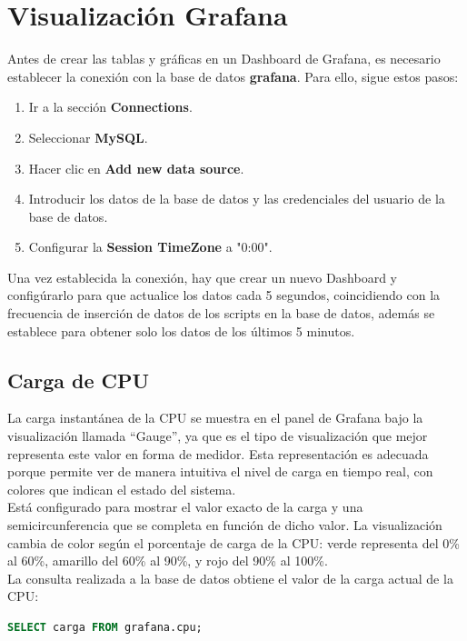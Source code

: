 \documentclass{article}
\begin{document}
\section{Visualización Grafana} \cite{grafana_mysql_docs} \cite{newsmatic_big_data}
Antes de crear las tablas y gráficas en un Dashboard de Grafana, es necesario establecer la conexión con la base de datos \textbf{grafana}. Para ello, sigue estos pasos:

\begin{enumerate}
    \item Ir a la sección \textbf{Connections}.
    \item Seleccionar \textbf{MySQL}.
    \item Hacer clic en \textbf{Add new data source}.
    \item Introducir los datos de la base de datos y las credenciales del usuario de la base de datos.
    \item Configurar la \textbf{Session TimeZone} a "0:00".
\end{enumerate}

Una vez establecida la conexión, hay que crear un nuevo Dashboard y configúrarlo para que actualice los datos cada 5 segundos, coincidiendo con la frecuencia de inserción de datos de los scripts en la base de datos, además se establece para obtener solo los datos de los últimos 5 minutos.

\subsection{Carga de CPU}

La carga instantánea de la CPU se muestra en el panel de Grafana bajo la visualización llamada ``Gauge'', ya que es el tipo de visualización que mejor representa este valor en forma de medidor. Esta representación es adecuada porque permite ver de manera intuitiva el nivel de carga en tiempo real, con colores que indican el estado del sistema.\\

Está configurado para mostrar el valor exacto de la carga y una semicircunferencia que se completa en función de dicho valor. La visualización cambia de color según el porcentaje de carga de la CPU: verde representa del 0\% al 60\%, amarillo del 60\% al 90\%, y rojo del 90\% al 100\%.\\

La consulta realizada a la base de datos obtiene el valor de la carga actual de la CPU:

\begin{lstlisting}[language=SQL]
SELECT carga FROM grafana.cpu;
\end{lstlisting}
\end{document}

